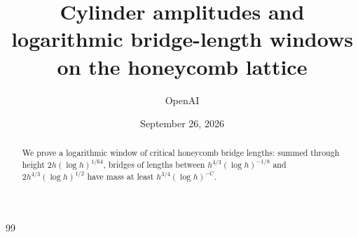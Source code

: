 \documentclass[11pt]{article}
\title{Cylinder amplitudes and logarithmic bridge-length windows on the honeycomb lattice}
\author{OpenAI}\date{September 26, 2026}
\numberwithin{equation}{section}
\theoremstyle{definition}\newtheorem{definition}[theorem]{Definition}
\theoremstyle{remark}\newtheorem{remark}[theorem]{Remark}
\begin{document}
\maketitle
\begin{abstract}
We prove a logarithmic window of critical honeycomb bridge lengths: summed through height $2h(\log h)^{1/64}$, bridges of lengths between $h^{4/3}(\log h)^{-1/8}$ and $2h^{4/3}(\log h)^{1/2}$ have mass at least $h^{3/4}(\log h)^{-C}$.
\end{abstract}

\tableofcontents











\begin{thebibliography}{99}

\end{thebibliography}
\end{document}
